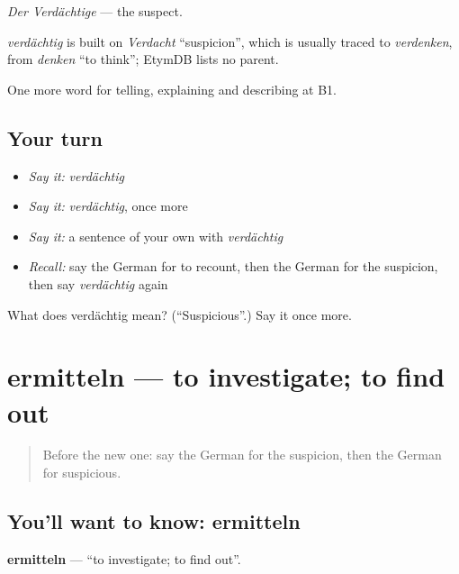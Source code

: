\emph{Der Verdächtige} — the suspect.

\begin{cousinweb}
\emph{verdächtig} is built on \emph{Verdacht} \textquotedblleft{}suspicion\textquotedblright{}, which is usually traced to \emph{verdenken}, from \emph{denken} \textquotedblleft{}to think\textquotedblright{}; EtymDB lists no parent.
\end{cousinweb}

\begin{grammarlens}[title={What you've built}]
One more word for telling, explaining and describing at B1.
\end{grammarlens}

\subsection*{Your turn}
\begin{itemize}
\raggedright
  \item \emph{Say it:} \emph{verdächtig}
  \item \emph{Say it:} \emph{verdächtig}, once more
  \item \emph{Say it:} a sentence of your own with \emph{verdächtig}
  \item \emph{Recall:} say the German for to recount, then the German for the suspicion, then say \emph{verdächtig} again
\end{itemize}

\begin{tcolorbox}[breakable,colback=teal!4,colframe=teal!35!black,title={Before you move on}]
What does verdächtig mean? (\textquotedblleft{}Suspicious\textquotedblright{}.) Say it once more.
\end{tcolorbox}
\section[ermitteln]{ermitteln — to investigate; to find out}

\label{lesson:GE-C284-ermitteln}



\begin{quote}
Before the new one: say the German for the suspicion, then the German for suspicious.
\end{quote}

\subsection*{You'll want to know: ermitteln}
\textbf{ermitteln} — \textquotedblleft{}to investigate; to find out\textquotedblright{}.

